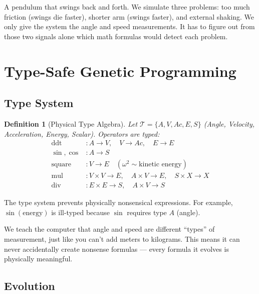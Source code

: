 \documentclass[11pt,a4paper]{article}
\newtheorem{definition}{Definition}
\begin{document}
\begin{plainbox}
A pendulum that swings back and forth. We simulate three problems: too much
friction (swings die faster), shorter arm (swings faster), and external
shaking. We only give the system the angle and speed measurements. It has to
figure out from those two signals alone which math formulas would detect each
problem.
\end{plainbox}

\section{Type-Safe Genetic Programming}

\subsection{Type System}

\begin{definition}[Physical Type Algebra]
Let $\mathcal{T} = \{A, V, Ac, E, S\}$ (Angle, Velocity, Acceleration,
Energy, Scalar). Operators are typed:
\begin{align}
\text{ddt}&: A \to V, \quad V \to Ac, \quad E \to E \\
\sin, \cos&: A \to S \\
\text{square}&: V \to E \quad (\omega^2 \sim \text{kinetic energy}) \\
\text{mul}&: V \times V \to E, \quad A \times V \to E, \quad S \times X \to X \\
\text{div}&: E \times E \to S, \quad A \times V \to S
\end{align}
\end{definition}

The type system prevents physically nonsensical expressions. For example,
$\sin(\text{energy})$ is ill-typed because $\sin$ requires type $A$ (angle).

\begin{plainbox}
We teach the computer that angle and speed are different ``types'' of
measurement, just like you can't add meters to kilograms. This means it can
never accidentally create nonsense formulas --- every formula it evolves is
physically meaningful.
\end{plainbox}

\subsection{Evolution}
\end{document}
